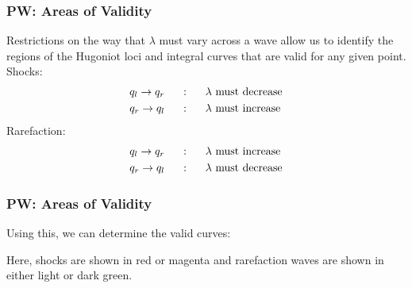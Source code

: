 \documentclass{beamer}
\begin{document}
\begin{frame}
\frametitle{PW: Areas of Validity}
Restrictions on the way that $\lambda$ must vary across a wave allow us to identify the regions of the Hugoniot loci and integral curves that are valid for any given point. \\
\vspace{0.1in}
Shocks:
\begin{align*}
q_l \rightarrow q_r \hspace{0.2in}&: \hspace{0.2in} \lambda \textnormal{ must decrease}\\
q_r \rightarrow q_l \hspace{0.2in}&: \hspace{0.2in} \lambda \textnormal{ must increase}
\end{align*}
Rarefaction:
\begin{align*}
q_l \rightarrow q_r \hspace{0.2in}&: \hspace{0.2in} \lambda \textnormal{ must increase}\\
q_r \rightarrow q_l \hspace{0.2in}&: \hspace{0.2in} \lambda \textnormal{ must decrease}
\end{align*}
\end{frame}

\begin{frame}
\frametitle{PW: Areas of Validity}
Using this, we can determine the valid curves:
\begin{figure}[h!]
 \centering
  \label{fig:PW_curves}
\end{figure}

Here, shocks are shown in red or magenta and rarefaction waves are shown in either light or dark green.

\end{frame}
\end{document}
